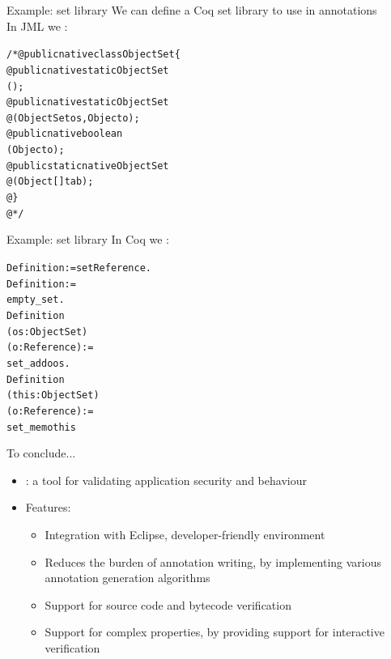 \documentclass[final,nocolorBG,a4,mobius,nototal,pdf,slideColor]{prosper}
\begin{document}
\begin{slide}{Example: set library}
We can define a Coq set library to use in annotations\\

In JML we :
\begin{alltt}
/*@ public native class ObjectSet \{
  @ public native static ObjectSet 
              ();
  @ public native static ObjectSet 
  @           (ObjectSet os, Object o);
  @ public native boolean 
              (Object o);
  @ public static native ObjectSet 
  @           (Object [] tab);
  @ \}
  @*/
\end{alltt}
\end{slide}

\begin{slide}{Example: set library}
In Coq we :
\begin{alltt}
Definition  := set Reference. 
Definition  := 
                     empty\_set.
Definition  
                     (os: ObjectSet) 
                     (o: Reference) :=  
                     set\_add o os.
Definition  
                     (this: ObjectSet) 
                     (o: Reference) := 
                     set\_mem o this
\end{alltt}
\end{slide}

\begin{slide}{To conclude...}
\begin{itemize}
\item {}: a tool for validating application security and behaviour
\item Features:
\begin{itemize}
\item Integration with Eclipse, developer-friendly environment
\item Reduces the burden of annotation writing, by implementing
various annotation generation algorithms
\item Support for source code and bytecode verification
\item Support for complex properties, by providing support for
interactive verification
\end{itemize}

\end{itemize}
\end{slide}
\end{document}
